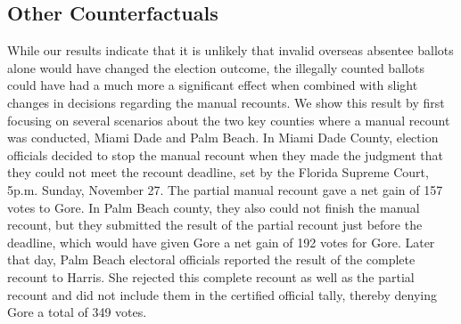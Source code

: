 \documentclass[11pt,titlepage]{article}
\begin{document}
\subsection{Other Counterfactuals}

While our results indicate that it is unlikely that invalid overseas
absentee ballots alone would have changed the election outcome, the
illegally counted ballots could have had a much more a significant
effect when combined with slight changes in decisions regarding the
manual recounts.  We show this result by first focusing on several
scenarios about the two key counties where a manual recount was
conducted, Miami Dade and Palm Beach. In Miami Dade County, election
officials decided to stop the manual recount when they made the
judgment that they could not meet the recount deadline, set by the
Florida Supreme Court, 5p.m.  Sunday, November 27.  The partial manual
recount gave a net gain of 157 votes to Gore. In Palm Beach county,
they also could not finish the manual recount, but they
submitted the result of the partial recount just before the deadline,
which would have given Gore a net gain of 192 votes for
Gore. Later that day, Palm Beach
electoral officials reported the result of the complete recount to
Harris.  She rejected this complete recount as well as the
partial recount and did not include them in the certified official
tally, thereby denying Gore a total of 349 votes.
\end{document}
